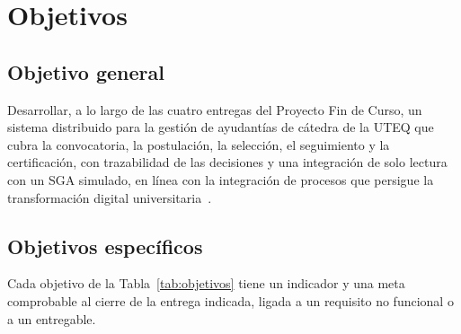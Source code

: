 \section{Objetivos}
\label{sec:objetivos}

\subsection{Objetivo general}
Desarrollar, a lo largo de las cuatro entregas del Proyecto Fin de Curso, un sistema distribuido para la gestión de ayudantías de cátedra de la UTEQ que cubra la convocatoria, la postulación, la selección, el seguimiento y la certificación, con trazabilidad de las decisiones y una integración de solo lectura con un SGA simulado, en línea con la integración de procesos que persigue la transformación digital universitaria~\cite{souli2025administracion}.

\subsection{Objetivos específicos}
Cada objetivo de la Tabla~\ref{tab:objetivos} tiene un indicador y una meta comprobable al cierre de la entrega indicada, ligada a un requisito no funcional o a un entregable.

